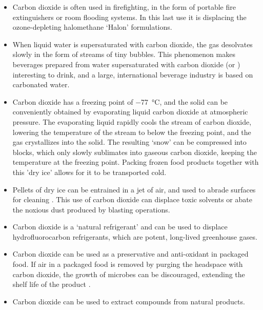 \begin{itemize}
  
  \item Carbon dioxide is often used in firefighting, in the form of portable
  fire extinguishers or room flooding systems. In this last use it is displacing
  the ozone-depleting halomethane `Halon' formulations.
  
  \item When liquid water is supersaturated with carbon dioxide, the gas
  desolvates slowly in the form of streams of tiny bubbles. This phenomenon
  makes beverages prepared from water supersaturated with carbon dioxide (or
  ) interesting to drink, and a large, international
  beverage industry is based on carbonated water.
   
   \item Carbon dioxide has a freezing point of \SI{-77}{\celsius}, and the
   solid can be conveniently obtained by evaporating liquid carbon dioxide at
   atmospheric pressure. The evaporating liquid rapidly cools the stream of
   carbon dioxide, lowering the temperature of the stream to below the freezing
   point, and the gas crystallizes into the solid. The resulting `snow' can be
   compressed into blocks, which only slowly sublimates into gaseous carbon
   dioxide, keeping the temperature at the freezing point. Packing frozen food
   products together with this 'dry ice' allows for it to be transported cold.
   
   \item Pellets of dry ice can be entrained in a jet of air, and used to abrade
   surfaces for cleaning \autocite{Spur1999}. This use of carbon dioxide can
   displace toxic solvents or abate the noxious dust produced by blasting operations.
   
   \item Carbon dioxide is a `natural refrigerant' \autocite{Pearson2005} and
   can be used to displace hydrofluorocarbon refrigerants, which are potent,
   long-lived greenhouse gases.
   
   \item Carbon dioxide can be used as a preservative and anti-oxidant in
   packaged food. If air in a packaged food is removed by purging the headspace
   with carbon dioxide, the growth of microbes can be discouraged, extending the
   shelf life of the product \autocite{Jacobsen2002}.
	   
	\item Carbon dioxide can be used to extract compounds from natural products. 
	
\end{itemize}

